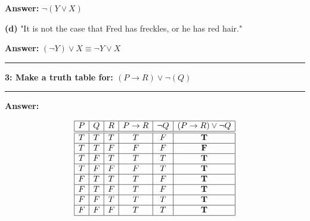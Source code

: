 \documentclass[11pt]{article}
\newcommand\question[2]{\vspace{.25in}\hrule\textbf{#1: #2}\vspace{.5em}\hrule\vspace{.10in}}
\renewcommand\part[1]{\vspace{.10in}\textbf{(#1)}}
\newcommand\answer{\vspace{.10in}\textbf{Answer: }}
\begin{document}
\answer $\lnot (Y \lor X)$

\part{d} "It is not the case that Fred has freckles, or he has red hair."

\answer $(\lnot Y) \lor X \equiv \lnot Y \lor X$

\clearpage

\question{3}{Make a truth table for: $(P \rightarrow R) \lor \lnot(Q)$}

\answer

\begin{displaymath}  %
  \begin{array}{|c|c|c|c|c|c|c|c|}\hline
    P & Q & R & P \rightarrow R & \lnot Q & (P \rightarrow R) \lor \lnot Q\\\hline\hline
    T & T & T & T & F & \mathbf{T}\\\hline
    T & T & F & F & F & \mathbf{F}\\\hline
    T & F & T & T & T & \mathbf{T}\\\hline
    T & F & F & F & T & \mathbf{T}\\\hline
    F & T & T & T & F & \mathbf{T}\\\hline
    F & T & F & T & F & \mathbf{T}\\\hline
    F & F & T & T & T & \mathbf{T}\\\hline
    F & F & F & T & T & \mathbf{T}\\\hline
  \end{array}
\end{displaymath}
\end{document}

